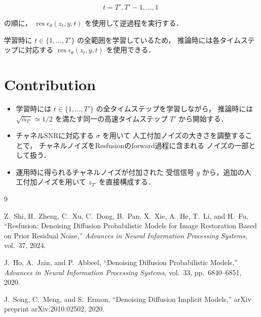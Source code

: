 \documentclass[a4paper,10pt,twocolumn]{ltjsarticle}
\begin{document}
\[
t=T',T'-1,\ldots,1
\]

の順に，
$\operatorname{res}\epsilon_{\theta}(z_t,y,t)$
を使用して逆過程を実行する．

学習時に
$t\in\{1,\ldots,T'\}$
の全範囲を学習しているため，
推論時には各タイムステップに対応する
$\operatorname{res}\epsilon_{\theta}(z_t,y,t)$
を使用できる．


\section{Contribution}

\begin{itemize}
  \item
  学習時には
  $t\in\{1,\ldots,T'\}$
  の全タイムステップを学習しながら，
  推論時には
  $\sqrt{\bar{\alpha}_{T'}}\simeq 1/2$
  を満たす同一の高速タイムステップ $T'$ から開始する．

  \item
  チャネルSNRに対応する $\sigma$ を用いて
  人工付加ノイズの大きさを調整することで，
  チャネルノイズをResfusionのforward過程に含まれる
  ノイズの一部として扱う．

  \item
  運用時に得られるチャネルノイズが付加された
  受信信号 $y$ から，追加の人工付加ノイズを用いて
  $z_{T'}$ を直接構成する．
\end{itemize}


\begin{thebibliography}{9}

Z.~Shi, H.~Zheng, C.~Xu, C.~Dong, B.~Pan, X.~Xie,
A.~He, T.~Li, and H.~Fu,
``Resfusion: Denoising Diffusion Probabilistic Models
for Image Restoration Based on Prior Residual Noise,''
\emph{Advances in Neural Information Processing Systems},
vol.~37, 2024.

J.~Ho, A.~Jain, and P.~Abbeel,
``Denoising Diffusion Probabilistic Models,''
\emph{Advances in Neural Information Processing Systems},
vol.~33, pp.~6840--6851, 2020.

J.~Song, C.~Meng, and S.~Ermon,
``Denoising Diffusion Implicit Models,''
arXiv preprint arXiv:2010.02502, 2020.

\end{thebibliography}
\end{document}
